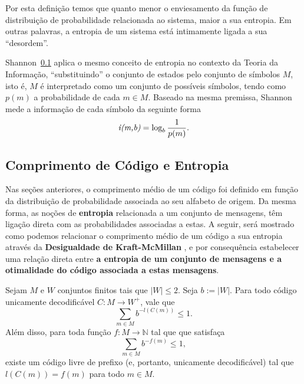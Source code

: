Por esta definição temos que quanto menor o enviesamento da função de distribuição de probabilidade relacionada ao sistema, maior a sua entropia. Em outras palavras, a entropia de um sistema está intimamente ligada a sua ``desordem''.

Shannon~\ref{} aplica o mesmo conceito de entropia no contexto da Teoria da Informação, ``substituindo'' o conjunto de estados pelo conjunto de símbolos $M$, isto é, $M$ é interpretado como um conjunto de possíveis símbolos, tendo como $p(m)$ a probabilidade de cada $m \in M$.
Baseado na mesma premissa, Shannon mede a informação de cada símbolo da seguinte forma
\begin{equation} \label{label:info_quantity}
\emph{i(m,b)} = \log_b \frac{1}{p(m)}.
\end{equation}

\subsection{Comprimento de Código e Entropia}
Nas seções anteriores, o comprimento médio de um código  foi definido em função da distribuição de probabilidade associada ao seu alfabeto de origem.
Da mesma forma, as noções de \textbf{entropia} relacionada a um conjunto de mensagens, têm ligação direta com as probabilidades associadas a estas. 
A seguir, será mostrado como podemos relacionar o comprimento médio de um código a sua entropia através da \textbf{Desigualdade de Kraft-McMillan} , e por consequência estabelecer uma relação direta entre \textbf{a entropia de um conjunto de mensagens e a otimalidade do código associada a estas mensagens}.

\begin{theorem}
  \label{thm:kraftmc}
  Sejam $M$ e $W$ conjuntos finitos tais que $|W|\leq 2$. Seja $b :=
  |W|$. Para todo código unicamente decodificável $C: M \to W^+$, vale
  que
  \begin{equation}
    \label{eq:cond_kraft_nec}
    \sum_{m\in M} b^{-l(C(m))} \leq 1.
  \end{equation}
  Além disso, para toda função $f: M\to\mathbb{N}$ tal que
  que satisfaça
  \begin{equation}
    \label{eq:cond_kraft_suf}
    \sum_{m \in M} b^{-f(m)} \leq 1,
  \end{equation}
  existe um código livre de prefixo (e, portanto, unicamente
  decodificável) tal que $l(C(m)) = f(m)$ para todo $m\in M$.
\end{theorem}

